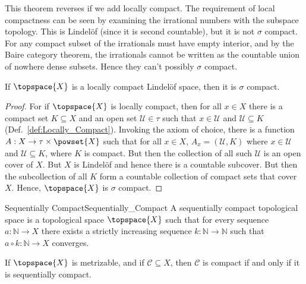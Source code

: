 \documentclass{article}                                                        %
\begin{document}
        This theorem reverses if we add locally compact. The requirement of
        local compactness can be seen by examining the irrational numbers with
        the subspace topology. This is Lindel\"{o}f (since it is second
        countable), but it is not $\sigma$ compact. For any compact subset of
        the irrationals must have empty interior, and by the Baire category
        theorem, the irrationals cannot be written as the countable union of
        nowhere dense subsets. Hence they can't possibly $\sigma$ compact.
        \begin{theorem}
            If $\topspace{X}$ is a locally compact Lindel\"{o}f space, then it
            is $\sigma$ compact.
        \end{theorem}
        \begin{proof}
            For if $\topspace{X}$ is locally compact, then for all $x\in{X}$
            there is a compact set $K\subseteq{X}$ and an open set
            $\mathcal{U}\in\tau$ such that $x\in\mathcal{U}$ and
            $\mathcal{U}\subseteq{K}$ (Def.~\ref{def:Locally_Compact}). Invoking
            the axiom of choice, there is a function
            $A:X\rightarrow\tau\times\powset{X}$ such that for all $x\in{X}$,
            $A_{x}=(\mathcal{U},K)$ where $x\in\mathcal{U}$ and
            $\mathcal{U}\subseteq{K}$, where $K$ is compact. But then the
            collection of all such $\mathcal{U}$ is an open cover of $X$. But
            $X$ is Lindel\"{o}f and hence there is a countable subcover. But
            then the subcollection of all $K$ form a countable collection of
            compact sets that cover $X$. Hence, $\topspace{X}$ is $\sigma$
            compact.
        \end{proof}
        \begin{fdefinition}{Sequentially Compact}{Sequentially_Compact}
            A sequentially compact topological space is a topological space
            $\topspace{X}$ such that for every sequence
            $a:\mathbb{N}\rightarrow{X}$ there exists a strictly increasing
            sequence $k:\mathbb{N}\rightarrow\mathbb{N}$ such that
            $a\circ{k}:\mathbb{N}\rightarrow{X}$ converges.
        \end{fdefinition}
        \begin{theorem}
            \label{thm:Met_Space_Seq_Compact_iff_Compact}%
            If $\topspace{X}$ is metrizable, and if $\mathcal{C}\subseteq{X}$,
            then $\mathcal{C}$ is compact if and only if it is sequentially
            compact.
        \end{theorem}
\end{document}
